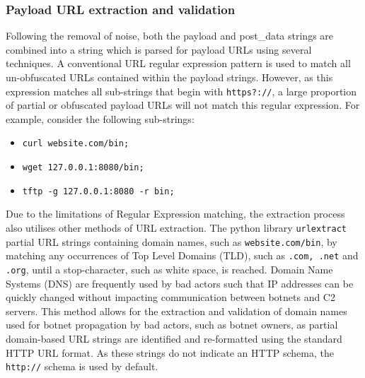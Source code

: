 \subsubsection{Payload URL extraction and validation} 

Following the removal of noise, both the payload and post\_data strings are combined into a string which is parsed for payload URLs using several techniques. A conventional URL regular expression pattern is used to match all un-obfuscated URLs contained within the payload strings. However, as this expression matches all sub-strings that begin with \texttt{https?://}, a large proportion of partial or obfuscated payload URLs will not match this regular expression. For example, consider the following sub-strings:

\begin{itemize}
    \item \texttt{curl website.com/bin;}
    \item \texttt{wget 127.0.0.1:8080/bin;}
    \item \texttt{tftp -g 127.0.0.1:8080 -r bin;}
\end{itemize}

Due to the limitations of Regular Expression matching, the extraction process also utilises other methods of URL extraction. The python library \texttt{urlextract} \citep{URLExtract} partial URL strings containing domain names, such as \texttt{website.com/bin}, by matching any occurrences of Top Level Domains (TLD), such as \texttt{.com, .net} and \texttt{.org}, until a stop-character, such as white space, is reached. Domain Name Systems (DNS) are frequently used by bad actors such that IP addresses can be quickly changed without impacting communication between botnets and C2 servers. This method allows for the extraction and validation of domain names used for botnet propagation by bad actors, such as botnet owners, as partial domain-based URL strings are identified and re-formatted using the standard HTTP URL format. As these strings do not indicate an HTTP schema, the \texttt{http://} schema is used by default.

